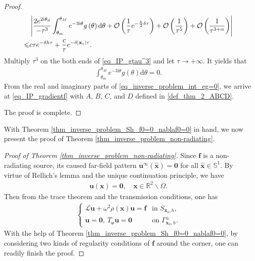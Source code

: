 \documentclass[11pt,reqno,oneside]{amsart}
\theoremstyle{definition}
\theoremstyle{remark}
\numberwithin{equation}{section}
\numberwithin{equation}{section}
\theoremstyle{remark}
\begin{document}
\begin{proof}
	\begin{align} \label{eq_IP_gtau^3}
		& \left|\frac{2e^{2\text{i}\theta_d}}{-\tau^3}  \int_{\theta_m}^{\theta_M} e^{-3\text{i}\theta} g\left(\theta\right) \mathrm{d}\theta + \mathcal{O} \left( \frac{1}{\tau} e^{-\frac{h}{2}\delta\tau} \right) + \mathcal{O} \left(\frac{1}{\tau^5}\right) + \mathcal{O} \left(\frac{1}{\tau^{3+\alpha}}\right)\right| \notag \\
		\leqslant & c\tau e^{- \delta h \tau} + \frac{c}{\tau}e^{-\delta\left|\mathbf{x}_{\varepsilon}\right|\tau} .
	\end{align}
	Multiply $ \tau^3 $ on the both ends of \eqref{eq_IP_gtau^3} and let $ \tau \to +\infty $. It yields that
	\begin{align} \label{eq_inverse_problem_int_eg=0}
		\int_{\theta_m}^{\theta_M} e^{-3\text{i}\theta} g\left(\theta\right) \mathrm{d}\theta = 0 . 
	\end{align}
	From the real and imaginary parts of \eqref{eq_inverse_problem_int_eg=0}, we arrive at \eqref{eq_IP_gradientf} with $ A $, $ B $, $ C $, and $ D $ defined in \eqref{def_thm_2_ABCD}.
	
	The proof is complete.
\end{proof}

With Theorem \ref{thm_inverse_problem_Sh_f0=0_nablaf0=0} in hand, we now present the proof of Theorem \ref{thm_inverse_problem_non-radiating}.

\begin{proof} [Proof of Theorem \ref{thm_inverse_problem_non-radiating}]
	Since $ \mathbf{f} $ is a non-radiating source, its caused far-field pattern $ \mathbf{u}^{\infty}\left(\hat{\mathbf{x}}\right) = \bm{0} $ for all $ \hat{\mathbf{x}}\in\mathbb{S}^1 $. By virtue of Rellich's lemma and the unique continuation principle, we have
	\begin{align*}
		\mathbf{u}\left(\mathbf{x}\right) = \bm{0}, \quad \mathbf{x}\in\mathbb{R}^2 \backslash \overline{\Omega}.
	\end{align*}
	Then from the trace theorem and the transmission conditions, one has
	\begin{align*} 
		\begin{cases}
			\mathcal{L} \mathbf{u} + \omega^2 \rho\left(\mathbf{x}\right) \mathbf{u} = \mathbf{f} & \text{in } S_{\mathbf{x}_0,h} , \\
			\mathbf{u} = \bm{0}, \ T_{\bm{\nu}} \mathbf{u} = \bm{0} & \text {on } \Gamma_{\mathbf{x}_0,h}^\pm .
		\end{cases}
	\end{align*}
	With the help of Theorem \ref{thm_inverse_problem_Sh_f0=0_nablaf0=0}, by considering two kinds of regularity conditions of $\mathbf f$ around the corner, one can readily finish the proof.
\end{proof}
\end{document}
